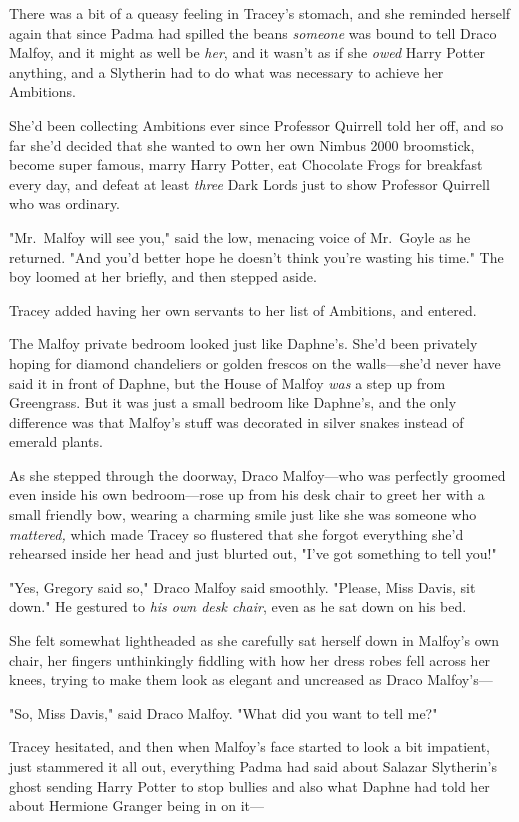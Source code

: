 There was a bit of a queasy feeling in Tracey's stomach, and she reminded
herself again that since Padma had spilled the beans \emph{someone} was bound
to tell Draco Malfoy, and it might as well be \emph{her}, and it wasn't as if
she \emph{owed} Harry Potter anything, and a Slytherin had to do what was
necessary to achieve her Ambitions.

She'd been collecting Ambitions ever since Professor Quirrell told her off, and
so far she'd decided that she wanted to own her own Nimbus 2000 broomstick,
become super famous, marry Harry Potter, eat Chocolate Frogs for breakfast
every day, and defeat at least \emph{three} Dark Lords just to show Professor
Quirrell who was ordinary.

"Mr.~Malfoy will see you," said the low, menacing voice of Mr.~Goyle as he
returned. "And you'd better hope he doesn't think you're wasting his time." The
boy loomed at her briefly, and then stepped aside.

Tracey added having her own servants to her list of Ambitions, and entered.

The Malfoy private bedroom looked just like Daphne's. She'd been privately
hoping for diamond chandeliers or golden frescos on the walls---she'd never
have said it in front of Daphne, but the House of Malfoy \emph{was} a step up
from Greengrass. But it was just a small bedroom like Daphne's, and the only
difference was that Malfoy's stuff was decorated in silver snakes instead of
emerald plants.

As she stepped through the doorway, Draco Malfoy---who was perfectly groomed
even inside his own bedroom---rose up from his desk chair to greet her with a
small friendly bow, wearing a charming smile just like she was someone who
\emph{mattered,} which made Tracey so flustered that she forgot everything
she'd rehearsed inside her head and just blurted out, "I've got something to
tell you!"

"Yes, Gregory said so," Draco Malfoy said smoothly. "Please, Miss Davis, sit
down." He gestured to \emph{his own desk chair}, even as he sat down on his bed.

She felt somewhat lightheaded as she carefully sat herself down in Malfoy's own
chair, her fingers unthinkingly fiddling with how her dress robes fell across
her knees, trying to make them look as elegant and uncreased as Draco
Malfoy's---

"So, Miss Davis," said Draco Malfoy. "What did you want to tell me?"

Tracey hesitated, and then when Malfoy's face started to look a bit impatient,
just stammered it all out, everything Padma had said about Salazar Slytherin's
ghost sending Harry Potter to stop bullies and also what Daphne had told her
about Hermione Granger being in on it---

